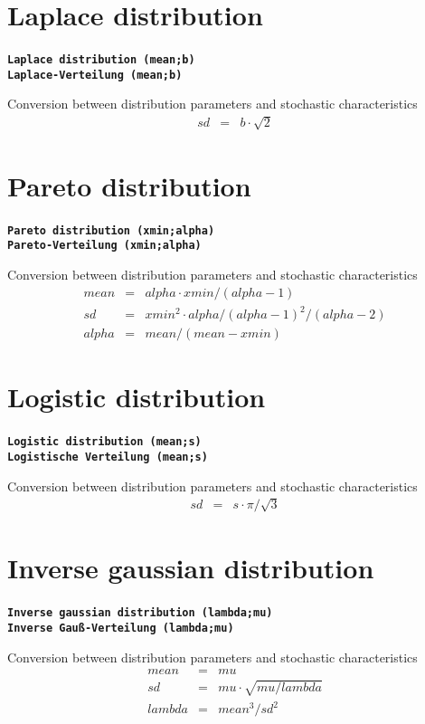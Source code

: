\documentclass{svmono}
\def\cm#1{\textbf{\texttt{#1}}}
\begin{document}
\section*{Laplace distribution}
\cm{Laplace distribution (mean;b)}~\\
\cm{Laplace-Verteilung (mean;b)}

Conversion between distribution parameters and stochastic characteristics
\begin{eqnarray*}
sd&=&b\cdot\sqrt{2}
\end{eqnarray*}





\section*{Pareto distribution}
\cm{Pareto distribution (xmin;alpha)}~\\
\cm{Pareto-Verteilung (xmin;alpha)}

Conversion between distribution parameters and stochastic characteristics
\begin{eqnarray*}
mean&=&alpha\cdot xmin/(alpha-1)\\
sd&=&xmin^2\cdot alpha/(alpha-1)^2/(alpha-2)\\
alpha&=&mean/(mean-xmin)
\end{eqnarray*}





\section*{Logistic distribution}
\cm{Logistic distribution (mean;s)}~\\
\cm{Logistische Verteilung (mean;s)}

Conversion between distribution parameters and stochastic characteristics
\begin{eqnarray*}
sd&=&s\cdot\pi/\sqrt{3}
\end{eqnarray*}





\section*{Inverse gaussian distribution}
\cm{Inverse gaussian distribution (lambda;mu)}~\\
\cm{Inverse Gauß-Verteilung (lambda;mu)}

Conversion between distribution parameters and stochastic characteristics
\begin{eqnarray*}
mean&=&mu\\
sd&=&mu\cdot\sqrt{mu/lambda}\\
lambda&=&mean^3/sd^2
\end{eqnarray*}
\end{document}
